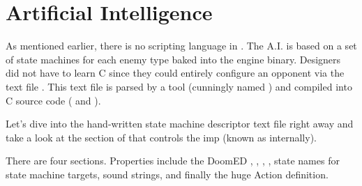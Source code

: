 \section{Artificial Intelligence}
As mentioned earlier, there is no scripting language in \doom. The A.I. is based on a set of state machines for each enemy type baked into the engine binary. Designers did not have to learn C since they could entirely configure an opponent via the text file . This text file is parsed by a tool (cunningly named ) and compiled into C source code ( and ).\\
\par
{}
\par
Let's dive into the hand-written state machine descriptor text file right away and take a look at the section of  that controls the imp (known as  internally).\\
\par
{}


There are four sections. Properties include the DoomED , , , , state names for state machine targets, sound strings, and finally the huge Action definition.






